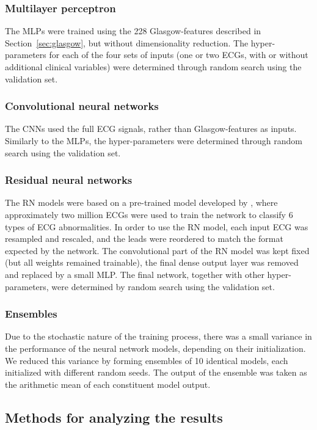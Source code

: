 \documentclass[preprint]{elsarticle}
\begin{document}
\subsubsection{Multilayer perceptron}
The MLPs were trained using the 228 Glasgow-features described in Section~\ref{sec:glasgow}, but without dimensionality reduction. The hyper-parameters for each of the four sets of inputs (one or two ECGs, with or without additional clinical variables) were determined through random search using the validation set.

\subsubsection{Convolutional neural networks}
The CNNs used the full ECG signals, rather than Glasgow-features as inputs. Similarly to the MLPs, the hyper-parameters were determined through random search using the validation set.

\subsubsection{Residual neural networks}
The RN models were based on a pre-trained model developed by \citet{ribeiro2020}, where approximately two million ECGs were used to train the network to classify 6 types of ECG abnormalities. In order to use the RN model, each input ECG was resampled and rescaled, and the leads were reordered to match the format expected by the network. The convolutional part of the RN model was kept fixed (but all weights remained trainable), the final dense output layer was removed and replaced by a small MLP. The final network, together with other hyper-parameters, were determined by random search using the validation set. 

\subsubsection{Ensembles}
Due to the stochastic nature of the training process, there was a small variance in the performance of the neural network models, depending on their initialization. We reduced this variance by forming ensembles of 10 identical models, each initialized with different random seeds. The output of the ensemble was taken as the arithmetic mean of each constituent model output.

\subsection{Methods for analyzing the results}
\end{document}

